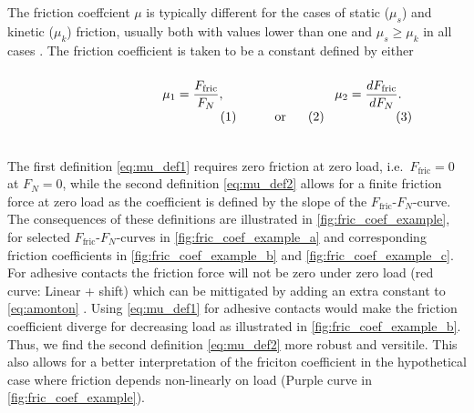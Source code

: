 The friction coeffcient $\mu$ is typically different for the cases of static
($\mu_s$) and kinetic ($\mu_k$) friction, usually both with values lower than
one and $\mu_s \ge \mu_k$ in all cases \cite[p. 6]{gnecco_meyer_2015}. The
friction coefficient is taken to be a constant defined by either
\cite{gao_frictional_2004} \\
\vspace{0.1cm}
\begin{subequations}
\noindent\begin{minipage}{.2\linewidth}
  \hfill
\end{minipage}
\begin{minipage}[b]{0.2\linewidth}
  \begin{align}
    \mu_1 = \frac{F_{\text{fric}}}{F_N},
    \label{eq:mu_def1}
  \end{align}
\end{minipage}
\begin{minipage}[b]{0.2\linewidth}
  \begin{align*}
    \text{or}
  \end{align*}
\end{minipage}
\begin{minipage}[b]{0.2\linewidth}
  \begin{align}
    \mu_2 = \frac{dF_{\text{fric}}}{dF_N}.
    \label{eq:mu_def2}
  \end{align}
\end{minipage}
\begin{minipage}{.2\linewidth}
\end{minipage}
\label{eq:mu_def}
\end{subequations}
\vspace{0.1cm}
\\
\noindent The first definition \cref{eq:mu_def1} requires zero friction at zero
load, i.e.\ $F_{\text{fric}} = 0$ at $F_N = 0$, while the second definition
\cref{eq:mu_def2} allows for a finite friction force at zero load as the
coefficient is defined by the slope of the $F_{\text{fric}}$-$F_N$-curve. The
consequences of these definitions are illustrated in
\cref{fig:fric_coef_example}, for selected $F_{\text{fric}}$-$F_N$-curves in
\cref{fig:fric_coef_example_a} and corresponding friction coefficients in
\cref{fig:fric_coef_example_b} and \cref{fig:fric_coef_example_c}. For adhesive
contacts the friction force will not be zero under zero load (red curve: Linear
+ shift) which can be mittigated by adding an extra constant to
\cref{eq:amonton} \cite{gao_frictional_2004}. Using \cref{eq:mu_def1} for
adhesive contacts would make the friction coefficient diverge for decreasing
load as illustrated in \cref{fig:fric_coef_example_b}. Thus, we find the second
definition \cref{eq:mu_def2} more robust and versitile. This also allows for a
better interpretation of the friciton coefficient in the hypothetical case where
friction depends non-linearly on load (Purple curve in
\cref{fig:fric_coef_example}). 


